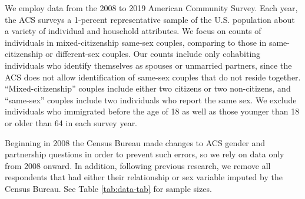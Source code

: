\documentclass[
  11pt,
]{article}
\begin{document}
We employ data from the 2008 to 2019 American Community Survey. Each year, the ACS surveys a 1-percent representative sample of the U.S. population about a variety of individual and household attributes. We focus on counts of individuals in mixed-citizenship same-sex couples, comparing to those in same-citizenship or different-sex couples. Our counts include only cohabiting individuals who identify themselves as spouses or unmarried partners, since the ACS does not allow identification of same-sex couples that do not reside together. ``Mixed-citizenship'' couples include either two citizens or two non-citizens, and ``same-sex'' couples include two individuals who report the same sex. We exclude individuals who immigrated before the age of 18 as well as those younger than 18 or older than 64 in each survey year.

Beginning in 2008 the Census Bureau made changes to ACS gender and partnership questions in order to prevent such errors, so we rely on data only from 2008 onward. In addition, following previous research, we remove all respondents that had either their relationship or sex variable imputed by the Census Bureau. See Table \ref{tab:data-tab} for sample sizes.

\providecommand{\docline}[3]{\noalign{\global\setlength{\arrayrulewidth}{#1}}\arrayrulecolor[HTML]{#2}\cline{#3}}

\setlength{\tabcolsep}{2pt}

\renewcommand*{\arraystretch}{1.5}
\end{document}
